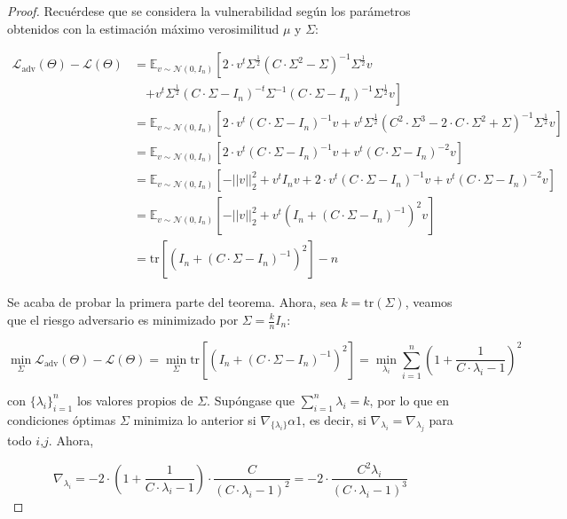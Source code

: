 \begin{itemize}
\begin{proof}
Recuérdese que se considera la vulnerabilidad según los parámetros obtenidos con la estimación máximo verosimilitud $\mu$ y $\Sigma$:

\begin{align*}
\mathcal{L}_{\text{adv}}(\Theta)-\mathcal{L}(\Theta) &= \mathbb{E}_{v \sim \mathcal{N}(0,I_n)} \left[ 2 \cdot v^{t} \Sigma^{\frac{1}{2}} (C \cdot \Sigma^2 - \Sigma)^{-1} \Sigma^{\frac{1}{2}}v \right. \\
&\quad \left. + v^{t} \Sigma^{\frac{1}{2}}(C \cdot \Sigma - I_n)^{-t} \Sigma^{-1}(C \cdot \Sigma - I_n)^{-1} \Sigma^{\frac{1}{2}}v \right] \\
&= \mathbb{E}_{v \sim \mathcal{N}(0,I_n)} \left[ 2 \cdot v^{t} (C \cdot \Sigma - I_n)^{-1}v + v^{t} \Sigma^{\frac{1}{2}}(C^2 \cdot \Sigma^3 - 2 \cdot C \cdot \Sigma^2 + \Sigma)^{-1} \Sigma^{\frac{1}{2}}v \right] \\
&= \mathbb{E}_{v \sim \mathcal{N}(0,I_n)} \left[ 2 \cdot v^{t}(C \cdot \Sigma - I_n)^{-1}v + v^{t} (C \cdot \Sigma - I_n)^{-2}v \right] \\
&= \mathbb{E}_{v \sim \mathcal{N}(0,I_n)} \left[ - ||v||_2^2 + v^{t}I_n v + 2 \cdot v^{t} (C \cdot \Sigma - I_n)^{-1} v + v^{t} (C \cdot \Sigma - I_n)^{-2}v \right] \\
&=\mathbb{E}_{v \sim \mathcal{N}(0,I_n)} \left[ -||v||_2^2 + v^{t}(I_n + (C \cdot \Sigma - I_n)^{-1})^2 v \right] \\
&=\text{tr} \left[ \left( I_n + (C \cdot \Sigma - I_n)^{-1} \right)^2 \right] - n
\end{align*}

Se acaba de probar la primera parte del teorema. Ahora, sea $k=\text{tr}(\Sigma)$, veamos que el riesgo adversario es minimizado por $\Sigma = \frac{k}{n} I_n$:

$$\min_{\Sigma} \mathcal{L}_{\text{adv}}(\Theta) - \mathcal{L}(\Theta) = \min_{\Sigma} \text{tr} \left[ \left( I_n+(C \cdot \Sigma - I_n)^{-1} \right)^2 \right] = \min_{{\lambda_i}} \sum_{i=1}^{n} \left( 1+\frac{1}{C \cdot \lambda_i - 1} \right)^2$$

con $\{\lambda_i\}_{i=1}^n$ los valores propios de $\Sigma$. Supóngase que $\sum_{i=1}^n \lambda_i = k$, por lo que en condiciones óptimas $\Sigma$ minimiza lo anterior si $\nabla_{\{\lambda_i\}} \alpha 1$, es decir, si $\nabla_{\lambda_i}=\nabla_{\lambda_j}$ para todo $i$,$j$. Ahora,

$$\nabla_{\lambda_i} = -2 \cdot \left( 1+\frac{1}{C \cdot \lambda_i - 1}\right) \cdot \frac{C}{(C \cdot \lambda_i -1)^2}=-2 \cdot \frac{C^2 \lambda_i}{(C \cdot \lambda_i -1)^3}$$


\end{proof}
\end{itemize}
